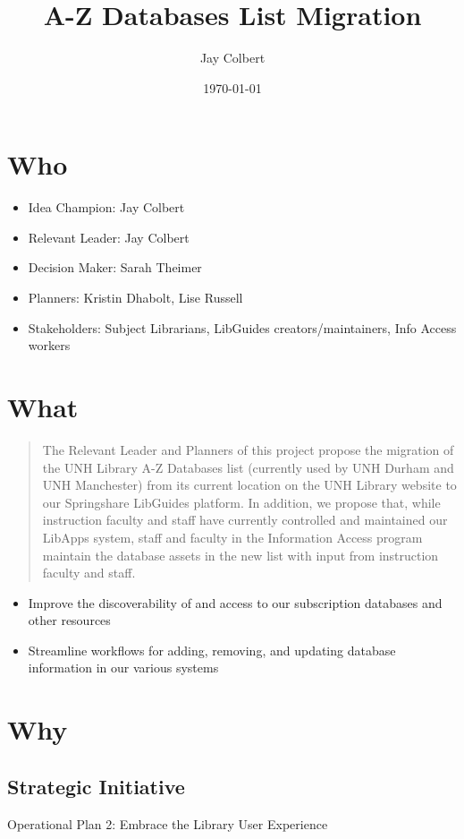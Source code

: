 \documentclass[11pt]{article}
\author{Jay Colbert}
\date{\today}
\title{A-Z Databases List Migration}
\begin{document}
\maketitle

\section*{Who}
\label{sec:org7469820}

\begin{itemize}
\item Idea Champion: Jay Colbert
\item Relevant Leader: Jay Colbert
\item Decision Maker: Sarah Theimer
\item Planners: Kristin Dhabolt, Lise Russell
\item Stakeholders: Subject Librarians, LibGuides creators/maintainers, Info Access workers
\end{itemize}

\section*{What}
\label{sec:orgbfccee1}

\begin{quote}
The Relevant Leader and Planners of this project propose the migration of the UNH Library A-Z Databases list (currently used by UNH Durham and UNH Manchester) from its current location on the UNH Library website to our Springshare LibGuides platform. In addition, we propose that, while instruction faculty and staff have currently controlled and maintained our LibApps system, staff and faculty in the Information Access program maintain the database assets in the new list with input from instruction faculty and staff.
\end{quote}

\begin{itemize}
\item Improve the discoverability of and access to our subscription databases and other resources
\item Streamline workflows for adding, removing, and updating database information in our various systems
\end{itemize}

\section*{Why}
\label{sec:org0dbcea4}
\subsection*{Strategic Initiative}
\label{sec:orga495aec}
Operational Plan 2: Embrace the Library User Experience
\end{document}
